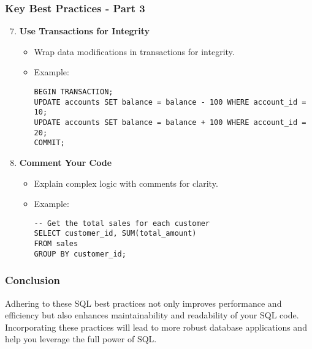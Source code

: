 \documentclass[aspectratio=169]{beamer}
\begin{document}
\begin{frame}[fragile]
    \frametitle{Key Best Practices - Part 3}
    \begin{enumerate}
        \setcounter{enumi}{6}
        \item \textbf{Use Transactions for Integrity}
        \begin{itemize}
            \item Wrap data modifications in transactions for integrity.
            \item Example:
            \begin{lstlisting}
BEGIN TRANSACTION;
UPDATE accounts SET balance = balance - 100 WHERE account_id = 10;
UPDATE accounts SET balance = balance + 100 WHERE account_id = 20;
COMMIT;
            \end{lstlisting}
        \end{itemize}

        \item \textbf{Comment Your Code}
        \begin{itemize}
            \item Explain complex logic with comments for clarity.
            \item Example:
            \begin{lstlisting}
-- Get the total sales for each customer
SELECT customer_id, SUM(total_amount) 
FROM sales
GROUP BY customer_id;
            \end{lstlisting}
        \end{itemize}
    \end{enumerate}
\end{frame}

\begin{frame}
    \frametitle{Conclusion}
    Adhering to these SQL best practices not only improves performance and efficiency but also enhances maintainability and readability of your SQL code. Incorporating these practices will lead to more robust database applications and help you leverage the full power of SQL.
\end{frame}
\end{document}
